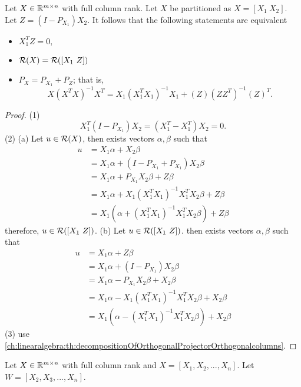\begin{refsection}
\begin{theorem}\label{ch:linearalgebra:th:decompositionOfOrthogonalProjector}\cite[224]{banerjee2014linear}
Let $X\in \mathbb{R}^{m\times n}$ with full column rank. Let $X$ be partitioned as $X = [X_1 ~ X_2]$. Let $Z = (I - P_{X_1})X_2$.
It follows that the following statements are equivalent
\begin{itemize}
	\item $X_1^TZ = 0,$
	\item $\mathcal{R}(X) = \mathcal{R}([X_1~Z])$
	\item $P_X = P_{X_1} + P_Z$; that is,
	$$  X(X^TX)^{-1}X^T  =  X_1(X^T_1X_1)^{-1}X_1 + (Z)(ZZ^T)^{-1}(Z)^T. $$ 
\end{itemize}
\end{theorem}
\begin{proof}
(1) $$X_1^T(I - P_{X_1})X_2 = (X_1^T-X_1^T)X_2 = 0.$$(2) (a) Let $u\in \mathcal{R}(X)$, then exists vectors $\alpha, \beta $ such that
\begin{align*}
u &= X_1\alpha + X_2\beta \\
  &= X_1\alpha + (I - P_{X_1} + P_{X_1})X_2\beta \\
  &= X_1\alpha +P_{X_1}X_2\beta+ Z\beta \\
  &= X_1\alpha + X_1(X^T_1X_1)^{-1}X_1^TX_2\beta + Z\beta\\
  &= X_1(\alpha + (X^T_1X_1)^{-1}X_1^TX_2\beta) + Z\beta
\end{align*}
therefore, $u \in \mathcal{R}([X_1~Z])$.
(b) Let $u \in \mathcal{R}([X_1~Z])$. then exists vectors $\alpha, \beta $ such that 
\begin{align*}
u &= X_1\alpha + Z\beta \\
&= X_1\alpha + (I - P_{X_1})X_2\beta \\
&= X_1\alpha -P_{X_1}X_2\beta+ X_2\beta \\
&= X_1\alpha - X_1(X^T_1X_1)^{-1}X_1^TX_2\beta + X_2\beta\\
&= X_1(\alpha - (X^T_1X_1)^{-1}X_1^TX_2\beta) + X_2\beta
\end{align*}
(3) use \autoref{ch:linearalgebra:th:decompositionOfOrthogonalProjectorOrthogonalcolumns}.
\end{proof}




\begin{corollary}\label{ch:linearalgebra:th:lowRankUpdateOfOrthogonalProjector}\cite[173]{theil1971principles}
Let $X\in \mathbb{R}^{m\times n}$ with full column rank and $X=[X_1,X_2,...,X_n]$. Let $W = [X_2,X_3,...,X_n]$.
	

\end{corollary}
\end{refsection}
